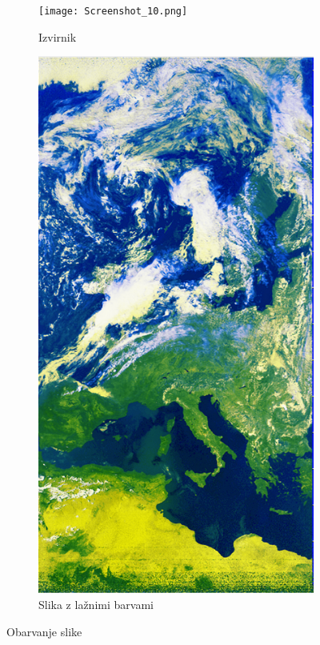 \documentclass[a4paper, twocolumn]{article}
\begin{document}
\begin{figure}[h]
	\centering
	\begin{subfigure}[t]{0.49\linewidth}
	\texttt{[image: Screenshot\_10.png]}
	\caption{Izvirnik}
\end{subfigure}
\begin{subfigure}[t]{0.49\linewidth}
	\includegraphics[width=\linewidth]{false_color.png}
	\caption{Slika z lažnimi barvami}
\end{subfigure}
\caption{Obarvanje slike}
\end{figure}
\end{document}
